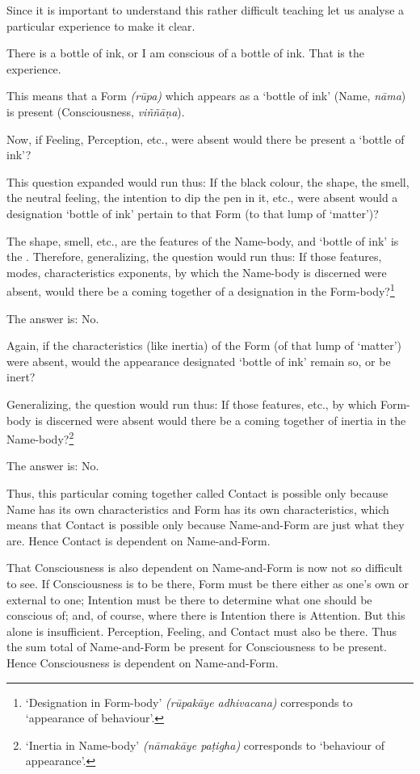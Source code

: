Since it is important to understand this rather difficult teaching let us analyse a particular experience to make it clear.

There is a bottle of ink, or I am conscious of a bottle of ink. That is the experience.

This means that a Form \emph{(rūpa)} which appears as a `bottle of ink' (Name, \emph{nāma}) is present (Consciousness, \emph{viññāṇa}).

Now, if Feeling, Perception, etc., were absent would there be present a `bottle of ink'?

This question expanded would run thus: If the black colour, the shape, the smell, the neutral feeling, the intention to dip the pen in it, etc., were absent would a designation `bottle of ink' pertain to that Form (to that lump of `matter')?

The shape, smell, etc., are the features of the Name-body, and `bottle of ink' is the . Therefore, generalizing, the question would run thus: If those features, modes, characteristics exponents, by which the Name-body is discerned were absent, would there be a coming together of a designation in the Form-body?\footnote{`Designation in Form-body' \emph{(rūpakāye adhivacana)} corresponds to `appearance of behaviour'.}

The answer is: No.

Again, if the characteristics (like inertia) of the Form (of that lump of `matter') were absent, would the appearance designated `bottle of ink' remain so, or be inert?

Generalizing, the question would run thus: If those features, etc., by which Form-body is discerned were absent would there be a coming together of inertia in the Name-body?\footnote{`Inertia in Name-body' \emph{(nāmakāye paṭigha)} corresponds to `behaviour of appearance'.}

The answer is: No.

Thus, this particular coming together called Contact is possible only because Name has its own characteristics and Form has its own characteristics, which means that Contact is possible only because Name-and-Form are just what they are. Hence Contact is dependent on Name-and-Form.

That Consciousness is also dependent on Name-and-Form is now not so difficult to see. If Consciousness is to be there, Form must be there either as one's own or external to one; Intention must be there to determine what one should be conscious of; and, of course, where there is Intention there is Attention. But this alone is insufficient. Perception, Feeling, and Contact must also be there. Thus the sum total of Name-and-Form  be present for Consciousness to be present. Hence Consciousness is dependent on Name-and-Form.

